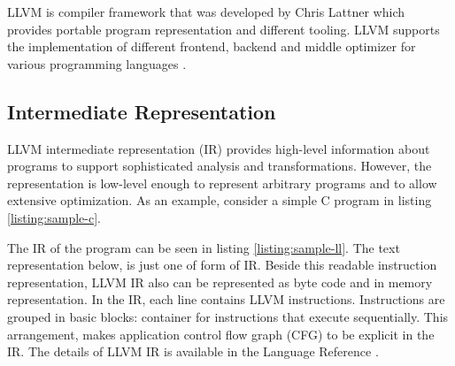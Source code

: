 LLVM is compiler framework that was developed by Chris Lattner which provides
portable program representation and different tooling. LLVM supports the
implementation of different frontend, backend and middle optimizer for various
programming languages \cite{lattnerLLVMCompilationFramework2004a}. 

\subsection{Intermediate Representation}

LLVM intermediate representation (IR) provides high-level information about
programs to support sophisticated analysis and transformations. However, the
representation is low-level enough to represent arbitrary programs and to allow
extensive optimization. As an example, consider a simple C program in listing
\ref{listing:sample-c}.


The IR of the program can be seen in listing \ref{listing:sample-ll}. The text
representation below, is just one of form of IR. Beside this readable
instruction representation, LLVM IR also can be represented as byte code and in
memory representation. In the IR, each line contains LLVM instructions.
Instructions are grouped in basic blocks: container for instructions that
execute sequentially. This arrangement, makes application control flow graph
(CFG) to be explicit in the IR. The details of LLVM IR is available in the
Language Reference \cite{LLVMLanguageReferencea}.



